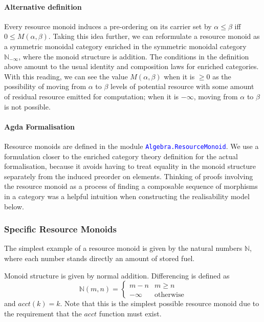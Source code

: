 \documentclass[acmsmall,screen]{acmart}
\newcommand{\natinf}{\mathbb{N}_{-\infty}}
\newcommand{\AgdaModule}[1]{\textcolor{blue}{\tt #1}}
\begin{document}
\paragraph{Alternative definition} Every resource monoid induces a
pre-ordering on its carrier set by $\alpha \leq \beta$ iff
$0 \leq M(\alpha, \beta)$. Taking this idea further, we can
reformulate a resource monoid as a symmetric monoidal category
enriched in the symmetric monoidal category $\natinf$, where the
monoid structure is addition. The conditions in the definition above
amount to the usual identity and composition laws for enriched
categories. With this reading, we can see the value $M(\alpha,\beta)$
when it is $\geq 0$ as the possibility of moving from $\alpha$ to
$\beta$ levels of potential resource with some amount of residual
resource emitted for computation; when it is $-\infty$, moving from
$\alpha$ to $\beta$ is not possible.

\paragraph{Agda Formalisation} Resource monoids are defined in the
module \AgdaModule{Algebra.ResourceMonoid}. We use a formulation
closer to the enriched category theory definition for the actual
formalisation, because it avoids having to treat equality in the
monoid structure separately from the induced preorder on
elements. Thinking of proofs involving the resource monoid as a
process of finding a composable sequence of morphisms in a category
was a helpful intuition when constructing the realisability model
below.

\subsubsection{Specific Resource Monoids}
\label{sec:specific-monoids}

The simplest example of a resource monoid is given by the natural
numbers $\mathbb{N}$, where each number stands directly an amount of
stored fuel.

\begin{definition}
  Monoid structure is given by normal addition. Differencing is
  defined as
  \begin{displaymath}
    \mathbb{N}(m,n) = \left\{
      \begin{array}{ll}
        m - n & m \geq n \\
        - \infty & \textrm{otherwise}
      \end{array}\right.
  \end{displaymath}
  and $\mathit{acct}(k) = k$. Note that this is the simplest possible
  resource monoid due to the requirement that the $\mathit{acct}$
  function must exist.
\end{definition}
\end{document}
